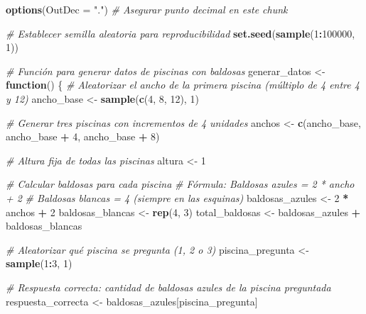 \documentclass[
]{article}
\author{}
\date{\vspace{-2.5em}}
\newenvironment{Shaded}{\begin{snugshade}}{\end{snugshade}}
\newcommand{\AttributeTok}[1]{\textcolor[rgb]{0.13,0.29,0.53}{#1}}
\newcommand{\CommentTok}[1]{\textcolor[rgb]{0.56,0.35,0.01}{\textit{#1}}}
\newcommand{\ControlFlowTok}[1]{\textcolor[rgb]{0.13,0.29,0.53}{\textbf{#1}}}
\newcommand{\DecValTok}[1]{\textcolor[rgb]{0.00,0.00,0.81}{#1}}
\newcommand{\FunctionTok}[1]{\textcolor[rgb]{0.13,0.29,0.53}{\textbf{#1}}}
\newcommand{\NormalTok}[1]{#1}
\newcommand{\OtherTok}[1]{\textcolor[rgb]{0.56,0.35,0.01}{#1}}
\newcommand{\SpecialCharTok}[1]{\textcolor[rgb]{0.81,0.36,0.00}{\textbf{#1}}}
\newcommand{\StringTok}[1]{\textcolor[rgb]{0.31,0.60,0.02}{#1}}
\begin{document}
\begin{Shaded}
\begin{Highlighting}[]
\FunctionTok{options}\NormalTok{(}\AttributeTok{OutDec =} \StringTok{"."}\NormalTok{)  }\CommentTok{\# Asegurar punto decimal en este chunk}

\CommentTok{\# Establecer semilla aleatoria para reproducibilidad}
\FunctionTok{set.seed}\NormalTok{(}\FunctionTok{sample}\NormalTok{(}\DecValTok{1}\SpecialCharTok{:}\DecValTok{100000}\NormalTok{, }\DecValTok{1}\NormalTok{))}

\CommentTok{\# Función para generar datos de piscinas con baldosas}
\NormalTok{generar\_datos }\OtherTok{\textless{}{-}} \ControlFlowTok{function}\NormalTok{() \{}
  \CommentTok{\# Aleatorizar el ancho de la primera piscina (múltiplo de 4 entre 4 y 12)}
\NormalTok{  ancho\_base }\OtherTok{\textless{}{-}} \FunctionTok{sample}\NormalTok{(}\FunctionTok{c}\NormalTok{(}\DecValTok{4}\NormalTok{, }\DecValTok{8}\NormalTok{, }\DecValTok{12}\NormalTok{), }\DecValTok{1}\NormalTok{)}
  
  \CommentTok{\# Generar tres piscinas con incrementos de 4 unidades}
\NormalTok{  anchos }\OtherTok{\textless{}{-}} \FunctionTok{c}\NormalTok{(ancho\_base, ancho\_base }\SpecialCharTok{+} \DecValTok{4}\NormalTok{, ancho\_base }\SpecialCharTok{+} \DecValTok{8}\NormalTok{)}
  
  \CommentTok{\# Altura fija de todas las piscinas}
\NormalTok{  altura }\OtherTok{\textless{}{-}} \DecValTok{1}
  
  \CommentTok{\# Calcular baldosas para cada piscina}
  \CommentTok{\# Fórmula: Baldosas azules = 2 * ancho + 2}
  \CommentTok{\# Baldosas blancas = 4 (siempre en las esquinas)}
\NormalTok{  baldosas\_azules }\OtherTok{\textless{}{-}} \DecValTok{2} \SpecialCharTok{*}\NormalTok{ anchos }\SpecialCharTok{+} \DecValTok{2}
\NormalTok{  baldosas\_blancas }\OtherTok{\textless{}{-}} \FunctionTok{rep}\NormalTok{(}\DecValTok{4}\NormalTok{, }\DecValTok{3}\NormalTok{)}
\NormalTok{  total\_baldosas }\OtherTok{\textless{}{-}}\NormalTok{ baldosas\_azules }\SpecialCharTok{+}\NormalTok{ baldosas\_blancas}
  
  \CommentTok{\# Aleatorizar qué piscina se pregunta (1, 2 o 3)}
\NormalTok{  piscina\_pregunta }\OtherTok{\textless{}{-}} \FunctionTok{sample}\NormalTok{(}\DecValTok{1}\SpecialCharTok{:}\DecValTok{3}\NormalTok{, }\DecValTok{1}\NormalTok{)}
  
  \CommentTok{\# Respuesta correcta: cantidad de baldosas azules de la piscina preguntada}
\NormalTok{  respuesta\_correcta }\OtherTok{\textless{}{-}}\NormalTok{ baldosas\_azules[piscina\_pregunta]}
  

\end{Highlighting}
\end{Shaded}
\end{document}
